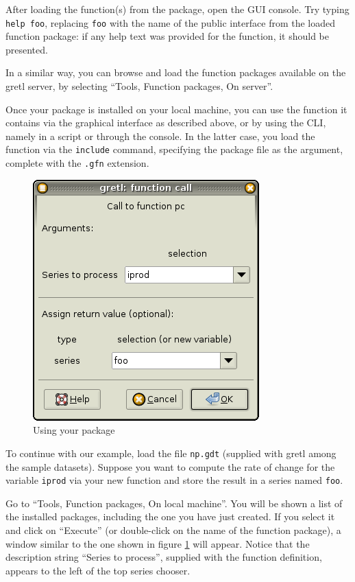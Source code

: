 After loading the function(s) from the package, open the GUI console.
Try typing \texttt{help foo}, replacing \texttt{foo} with the name of
the public interface from the loaded function package: if any help text
was provided for the function, it should be presented.

In a similar way, you can browse and load the function packages
available on the gretl server, by selecting ``Tools, Function
packages, On server''.

Once your package is installed on your local machine, you can use the
function it contains via the graphical interface as described above,
or by using the CLI, namely in a script or through the console. In the
latter case, you load the function via the \texttt{include} command,
specifying the package file as the argument, complete with the
\texttt{.gfn} extension.

\begin{figure}[htbp]
  \centering
  \includegraphics[scale=0.5]{figures/function_call}
  \caption{Using your package}
  \label{fig:function_call}
\end{figure}

To continue with our example, load the file \texttt{np.gdt} (supplied
with gretl among the sample datasets). Suppose you want to
compute the rate of change for the variable \texttt{iprod} via your
new function and store the result in a series named \texttt{foo}.

Go to ``Tools, Function packages, On local machine''.  You will be
shown a list of the installed packages, including the one you have
just created. If you select it and click on ``Execute'' (or
double-click on the name of the function package), a window similar to
the one shown in figure \ref{fig:function_call} will appear.  Notice
that the description string ``Series to process'', supplied with the
function definition, appears to the left of the top series chooser.

